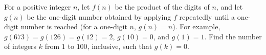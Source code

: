 For a positive integer $n$, let $f(n)$ be the product of the digits of $n$, and let $g(n)$ be the one-digit number obtained by applying $f$ repeatedly until a one-digit number is reached (for a one-digit $n$, $g(n)=n$). For example, $g(673)=g(126)=g(12)=2$, $g(10)=0$, and $g(1)=1$. Find the number of integers $k$ from $1$ to $100$, inclusive, such that $g(k)=0$.
